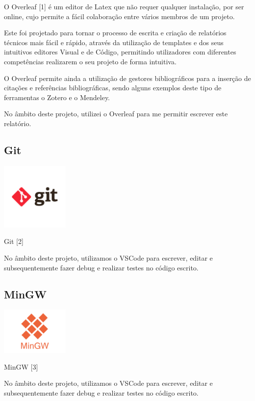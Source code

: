 \documentclass[a4paper,12pt]{article}
\begin{document}
O Overleaf [1] é um editor de Latex que não requer qualquer instalação, por ser online, cujo permite a fácil colaboração entre vários membros de um projeto.

Este foi projetado para tornar o processo de escrita e criação de relatórios técnicos mais fácil e rápido, através da utilização de templates e dos seus intuitivos editores Visual e de Código, permitindo utilizadores com diferentes competências realizarem o seu projeto de forma intuitiva.

O Overleaf permite ainda a utilização de gestores bibliográficos para a inserção de citações e referências bibliográficas, sendo alguns exemplos deste tipo de ferramentas o Zotero e o Mendeley.

No âmbito deste projeto, utilizei o Overleaf para me permitir escrever este relatório.

\subsection{Git}
    \includegraphics[width=0.25\textwidth]{git.png} %
    \vspace{0.5cm}

Git [2]

No âmbito deste projeto, utilizamos o VSCode para escrever, editar e subsequentemente fazer debug e realizar testes no código escrito.

\subsection{MinGW}
    \includegraphics[width=0.25\textwidth]{mingw.png} %
    \vspace{0.5cm}

MinGW [3]

No âmbito deste projeto, utilizamos o VSCode para escrever, editar e subsequentemente fazer debug e realizar testes no código escrito.
\end{document}
